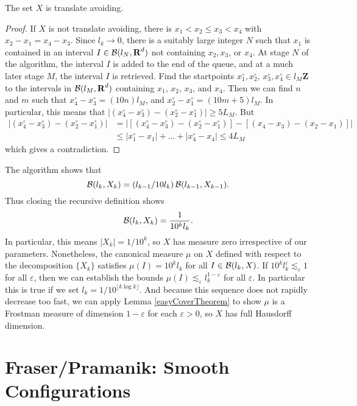 \begin{lemma}
    The set $X$ is translate avoiding.
\end{lemma}
\begin{proof}
    If $X$ is not translate avoiding, there is $x_1 < x_2 \leq x_3 < x_4$ with $x_2 - x_1 = x_4 - x_3$. Since $l_k \to 0$, there is a suitably large integer $N$ such that $x_1$ is contained in an interval $I \in \operatorname{\mathcal{B}}(l_N,\operatorname{\mathbf{R}}^d)$ not containing $x_2,x_3$, or $x_4$. At stage $N$ of the algorithm, the interval $I$ is added to the end of the queue, and at a much later stage $M$, the interval $I$ is retrieved. Find the startpoints $x_1^\circ, x_2^\circ$, $x_3^\circ, x_4^\circ \in l_M \mathbf{Z}$ to the intervals in $\operatorname{\mathcal{B}}(l_M,\operatorname{\mathbf{R}}^d)$ containing $x_1$, $x_2$, $x_3$, and $x_4$. Then we can find $n$ and $m$ such that $x_4^\circ - x_3^\circ = (10n)l_M$, and $x_2^\circ - x_1^\circ = (10m + 5)l_M$. In particular, this means that $|(x_4^\circ - x_3^\circ) - (x_2^\circ - x_1^\circ)| \geq 5L_M$. But
    \begin{align*}
        |(x_4^\circ - x_3^\circ) - (x_2^\circ - x_1^\circ)| &= |[(x_4^\circ - x_3^\circ) - (x_2^\circ - x_1^\circ)] - [(x_4 - x_3) - (x_2 - x_1)]|\\
        &\leq |x_1^\circ - x_1| + \dots + |x_4^\circ - x_4| \leq 4 L_M
    \end{align*}
    which gives a contradiction.
\end{proof}

The algorithm shows that
%
\[ \operatorname{\mathcal{B}}(l_k,X_k) = (l_{k-1}/10l_k) \operatorname{\mathcal{B}}(l_{k-1},X_{k-1}). \]
%
Thus closing the recursive definition shows
%
\[ \operatorname{\mathcal{B}}(l_k,X_k) = \frac{1}{10^k l_k}. \]
%
In particular, this means $|X_k| = 1/10^k$, so $X$ has measure zero irrespective of our parameters. Nonetheless, the canonical measure $\mu$ on $X$ defined with respect to the decomposition $\{ X_k \}$ satisfies $\mu(I) = 10^k l_k$ for all $I \in \operatorname{\mathcal{B}}(l_k,X)$. If $10^k l_k^\varepsilon \lesssim_\varepsilon 1$ for all $\varepsilon$, then we can establish the bounds $\mu(I) \lesssim_\varepsilon l_k^{1-\varepsilon}$ for all $\varepsilon$. In particular this is true if we set $l_k = 1/10^{\lfloor k \log k \rfloor}$. And because this sequence does not rapidly decrease too fast, we can apply Lemma \ref{easyCoverTheorem} to show $\mu$ is a Frostman measure of dimension $1-\varepsilon$ for each $\varepsilon > 0$, so $X$ has full Hausdorff dimension.







\section{Fraser/Pramanik: Smooth Configurations}

